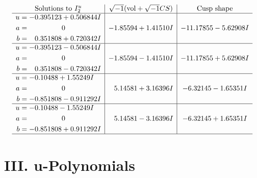 \documentclass[1p]{elsarticle_modified}
\theoremstyle{definition}
\newcommand{\I}{\sqrt{-1}}
\begin{document}
$$\begin{array}{c|c|c}  
\text{Solutions to }I^u_{2}& \I (\text{vol} + \sqrt{-1}CS) & \text{Cusp shape}\\
 \hline 
\begin{aligned}
u &= -0.395123 + 0.506844 I \\
a &= \phantom{-0.000000 } 0 \\
b &= \phantom{-}0.351808 + 0.720342 I\end{aligned}
 & -1.85594 + 1.41510 I & -11.17855 - 5.62908 I \\ \hline\begin{aligned}
u &= -0.395123 - 0.506844 I \\
a &= \phantom{-0.000000 } 0 \\
b &= \phantom{-}0.351808 - 0.720342 I\end{aligned}
 & -1.85594 - 1.41510 I & -11.17855 + 5.62908 I \\ \hline\begin{aligned}
u &= -0.10488 + 1.55249 I \\
a &= \phantom{-0.000000 } 0 \\
b &= -0.851808 - 0.911292 I\end{aligned}
 & \phantom{-}5.14581 + 3.16396 I & -6.32145 - 1.65351 I \\ \hline\begin{aligned}
u &= -0.10488 - 1.55249 I \\
a &= \phantom{-0.000000 } 0 \\
b &= -0.851808 + 0.911292 I\end{aligned}
 & \phantom{-}5.14581 - 3.16396 I & -6.32145 + 1.65351 I\\
 \hline 
 \end{array}$$\newpage
\newpage\renewcommand{\arraystretch}{1}
\centering \section*{ III. u-Polynomials}
\end{document}
